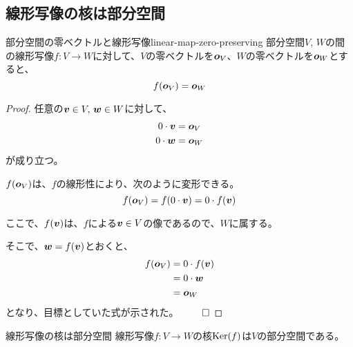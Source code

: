 \documentclass[../../../topic_linear-algebra]{subfiles}
\begin{document}
\subsection{線形写像の核は部分空間}

\begin{theorem}{部分空間の零ベクトルと線形写像}{linear-map-zero-preserving}
  部分空間$V,\,W$の間の線形写像$f\colon V \to W$に対して、$V$の零ベクトルを$\vb*{o}_V$、$W$の零ベクトルを$\vb*{o}_W$とすると、
  \begin{equation*}
    f(\vb*{o}_V) = \vb*{o}_W
  \end{equation*}
\end{theorem}

\begin{proof}
  任意の$\vb*{v} \in V,\, \vb*{w} \in W$に対して、
  \begin{align*}
    0  \cdot \vb*{v} & = \vb*{o}_V \\
    0 \cdot \vb*{w}  & = \vb*{o}_W
  \end{align*}
  が成り立つ。

  \br

  $f(\vb*{o}_V)$は、$f$の線形性により、次のように変形できる。
  \begin{equation*}
    f(\vb*{o}_V) = f(0 \cdot \vb*{v}) = 0 \cdot f(\vb*{v})
  \end{equation*}

  ここで、$f(\vb*{v})$は、$f$による$\vb*{v} \in V$の像であるので、$W$に属する。

  そこで、$\vb*{w} = f(\vb*{v})$とおくと、
  \begin{align*}
    f(\vb*{o}_V) & = 0 \cdot f(\vb*{v}) \\
                 & = 0 \cdot \vb*{w}    \\
                 & = \vb*{o}_W
  \end{align*}
  となり、目標としていた式が示された。 $\qed$
\end{proof}


\begin{theorem*}{線形写像の核は部分空間}
  線形写像$f\colon V \to W$の核$\operatorname{Ker}(f)$は$V$の部分空間である。
\end{theorem*}
\end{document}
